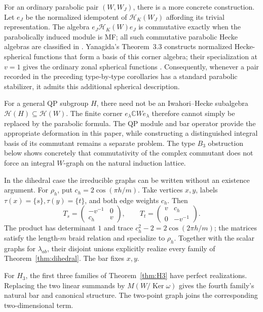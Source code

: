 \documentclass[11pt]{article}
\numberwithin{equation}{section}
\theoremstyle{definition}
\DeclareMathOperator{\Ker}{Ker}
\newcommand{\C}{\mathbb C}
\newcommand{\HH}{\mathcal H}
\newcommand{\om}{\omega}
\begin{document}
For an ordinary parabolic pair \((W,W_J)\), there is a more concrete
construction.  Let \(e_J\) be the normalized idempotent of
\(\HH_K(W_J)\) affording its trivial representation.  The algebra
\(e_J\HH_K(W)e_J\) is commutative exactly when the parabolically
induced module is MF; all such commutative parabolic Hecke algebras are
classified in \cite{APVM}.  Yanagida's Theorem~3.3 constructs normalized
Hecke-spherical functions that form a basis of this corner algebra;
their specialization at \(v=1\) gives the ordinary zonal spherical
functions \cite{Yanagida}.  Consequently, whenever a pair recorded in the
preceding type-by-type corollaries has a standard parabolic stabilizer,
it admits this additional spherical description.

For a general QP subgroup \(H\), there need not be an Iwahori--Hecke
subalgebra \(\HH(H)\subseteq\HH(W)\).  The finite corner
\(e_\lambda\C W e_\lambda\) therefore cannot simply be replaced by
the parabolic formula.  The QP module and bar operator provide the
appropriate deformation in this paper, while constructing a
distinguished integral basis of its commutant remains a separate
problem.  The type \(B_3\) obstruction below shows concretely that
commutativity of the complex commutant does not force an integral
\(W\)-graph on the natural induction lattice.

In the dihedral case the irreducible graphs can be written without an existence argument.
For \(\rho_h\), put \(c_h=2\cos(\pi h/m)\).
Take vertices \(x,y\), labels \(\tau(x)=\{s\},\tau(y)=\{t\}\), and both edge weights \(c_h\).
Then
\[
 T_s=\begin{pmatrix}-v^{-1}&0\\c_h&v\end{pmatrix},
 \qquad
 T_t=\begin{pmatrix}v&c_h\\0&-v^{-1}\end{pmatrix}.
\]
The product has determinant \(1\) and trace
\(c_h^2-2=2\cos(2\pi h/m)\); the matrices satisfy the length-\(m\) braid relation and specialize to \(\rho_h\).
Together with the scalar graphs for \(\lambda_{ab}\), their disjoint unions explicitly realize every family of Theorem~\ref{thm:dihedral}.
The bar fixes \(x,y\).

For \(H_3\), the first three families of Theorem~\ref{thm:H3} have perfect realizations.
Replacing the two linear summands by \(M(W/\Ker\om)\) gives the fourth family's natural bar and canonical structure.
The two-point graph joins the corresponding two-dimensional term.
\end{document}
